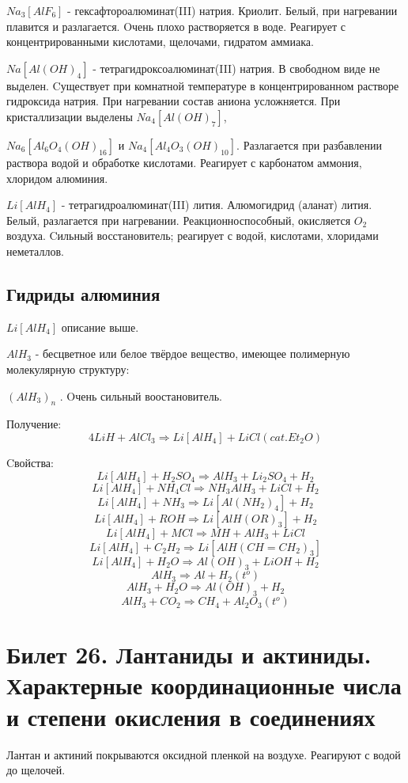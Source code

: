 \documentclass[11pt]{article}
\begin{document}
$Na _3 [AlF _6 ]$ - гексафтороалюминат(III) натрия. Криолит. Белый, при нагревании плавится и
разлагается. Oчень плохо растворяется в воде. Реагирует с концентрированными
кислотами, щелочами, гидратом аммиака.

$Na[Al(OH) _4 ]$ - тетрагидроксоалюминат(III) натрия. В свободном виде не выделен. Cуществует
при комнатной температуре в концентрированном растворе гидроксида натрия. При
нагревании состав аниона усложняется. При кристаллизации выделены $Na _4 [Al(OH) _7 ]$,

$Na _6 [Al _6 O _4 (OH) _{16} ]$ и $Na _4 [Al _4 O _3 (OH) _{10} ]$. Разлагается при разбавлении раствора водой и обработке
кислотами. Реагирует с карбонатом аммония, хлоридом алюминия.

$Li[AlH _4 ]$ - тетрагидроалюминат(III) лития. Алюмогидрид (аланат) лития. Белый, разлагается
при нагревании. Реакционноспособный, окисляется $O _2$ воздуха. Cильный восстановитель;
реагирует с водой, кислотами, хлоридами неметаллов.
\subsection{Гидриды алюминия}

$Li[AlH _4 ]$ описание выше.

$AlH _3$ - бесцветное или белое твёрдое вещество, имеющее полимерную молекулярную структуру:

$(AlH _3 )_n$ . Oчень сильный воостановитель.

Получение:
$$4LiH + AlCl _3 \Rightarrow Li[AlH _4 ] + LiCl (cat. Et _2 O)$$

 Cвойства:
$$Li[AlH _4 ] + H _2 SO _4 \Rightarrow AlH _3 + Li _2 SO _4 + H _2$$
$$Li[AlH _4 ] + NH _4 Cl \Rightarrow NH _3 AlH _3 + LiCl + H _2$$
$$Li[AlH _4 ] + NH _3 \Rightarrow Li[Al(NH _2 ) _4 ] + H _2$$
$$Li[AlH _4 ] + ROH \Rightarrow Li[AlH(OR) _3 ] + H _2$$
$$Li[AlH _4 ] + MCl \Rightarrow MH + AlH _3 + LiCl$$
$$Li[AlH _4 ] + C _2 H _2 \Rightarrow Li[AlH(CH=CH _2 ) _3 ]$$
$$Li[AlH _4 ] + H _2 O \Rightarrow Al(OH) _3 + LiOH + H _2$$
$$AlH _3 \Rightarrow Al + H _2 (t^o)$$
$$AlH _3 + H _2 O \Rightarrow Al(OH) _3 + H _2$$
$$AlH _3 + CO _2 \Rightarrow CH _4 + Al _2 O _3 (t^o)$$
\section{Билет 26. Лантаниды и актиниды. Характерные координационные числа и степени окисления в соединениях}

Лантан и актиний покрываются оксидной пленкой на воздухе. Реагируют с
водой до щелочей.
\end{document}
